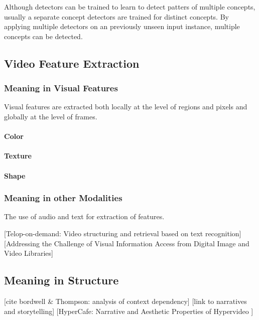 Although detectors can be trained to learn to detect patters of multiple concepts, usually a separate concept detectors are trained for distinct concepts. By applying multiple detectors on an previously unseen input instance, multiple concepts can be detected.

\subsection{Video Feature Extraction}

\subsubsection{Meaning in Visual Features}

Visual features are extracted both locally at the level of regions and pixels and globally at the level of frames.

\paragraph{Color}

\paragraph{Texture}

\paragraph{Shape}

\subsubsection{Meaning in other Modalities}
The use of audio and text for extraction of features.

[Telop-on-demand: Video structuring and retrieval based on text recognition]\cite{Kuwano:2000wy}
[Addressing the Challenge of Visual Information Access from Digital Image and Video Libraries]\cite{Christel:2005td}

\subsection{Meaning in Structure}


[cite bordwell \& Thompson: analysis of context dependency]
[link to narratives and storytelling]
[HyperCafe: Narrative and Aesthetic Properties of Hypervideo \cite{Sawhney:1996tk}]

